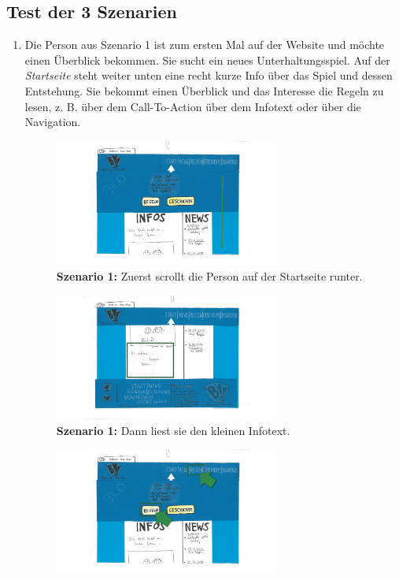 \documentclass{scrartcl}
\begin{document}
\subsection*{Test der 3 Szenarien}
\begin{enumerate} 
\item Die Person aus Szenario 1 ist zum ersten Mal auf der Website und möchte einen Überblick bekommen. Sie sucht ein neues Unterhaltungsspiel. Auf der \textit{Startseite} steht weiter unten eine recht kurze Info über das Spiel und dessen Entstehung. Sie bekommt einen Überblick und das Interesse die Regeln zu lesen, z. B. über dem Call-To-Action über dem Infotext oder über die Navigation.
  \begin{figure}[H]
 \begin{center}
 \includegraphics[width=0.7\textwidth]{szenario1-1.jpg}
\caption{\textbf{Szenario 1:} Zuerst scrollt die Person auf der Startseite runter.}
 \end{center}
\end{figure}  
  \begin{figure}[H]
 \begin{center}
 \includegraphics[width=0.7\textwidth]{szenario1-2.jpg}
\caption{\textbf{Szenario 1:} Dann liest sie den kleinen Infotext.}
 \end{center}
\end{figure}  
  \begin{figure}[H]
 \begin{center}
 \includegraphics[width=0.7\textwidth]{szenario1-3.jpg}

\end{center}
\end{figure}
\end{enumerate}
\end{document}
